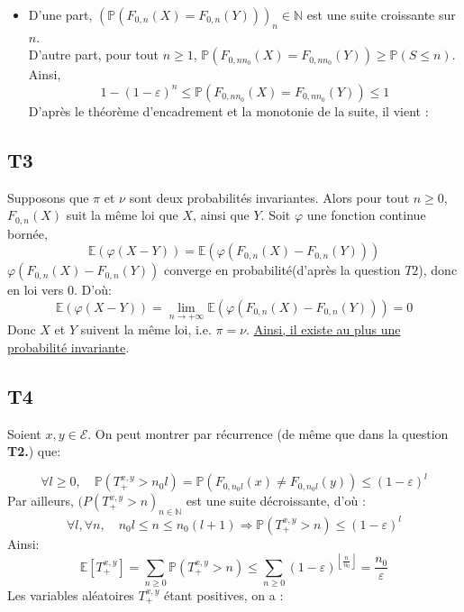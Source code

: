 \documentclass[a4paper,11pt]{article}
\def \P{\mathbb{P}}
\def \E{\mathcal{E}}
\def \esp{\mathbb{E}}
\begin{document}
\begin{itemize}
\begin{center}
\end{center}

\item[\textbullet]
D'une part, $(\mathbb{P}(F_{0,n}(X)=F_{0,n}(Y)))_n\in \mathbb{N}$ est une suite croissante sur $n$.\\
D'autre part, pour tout $n\geq 1$, $\mathbb{P}(F_{0,nn_0}(X)=F_{0,nn_0}(Y))\geq\mathbb{P}(S\leq n)$.\\
Ainsi,
\[1-(1-\varepsilon)^n\leq\mathbb{P}(F_{0,nn_0}(X)=F_{0,nn_0}(Y))\leq1\]
D'après le théorème d'encadrement et la monotonie de la suite, il vient :

\begin{center}
\end{center}

\end{itemize}

\subsection*{T3}
Supposons que $\pi$ et $\nu$ sont deux probabilités invariantes. 
Alors pour tout $n\geq0$, $F_{0,n}(X)$ suit la même loi que $X$, ainsi que $Y$.
Soit $\varphi$ une fonction continue bornée,
\[\mathbb{E}(\varphi(X-Y))=\mathbb{E}(\varphi(F_{0,n}(X)-F_{0,n}(Y)))\]
$\varphi(F_{0,n}(X)-F_{0,n}(Y))$ converge en probabilité(d'après la question $T2$), donc en loi vers $0$.
D'où:
\[\mathbb{E}(\varphi(X-Y))=\lim \limits_{n \rightarrow +\infty}\mathbb{E}(\varphi(F_{0,n}(X)-F_{0,n}(Y)))=0\]
Donc $X$ et $Y$ suivent la même loi, i.e. $\pi = \nu$.
\underline{Ainsi, il existe au plus une probabilité invariante}.

\subsection*{T4}
Soient $x,y \in \E$.
On peut montrer par récurrence (de même que dans la question \textbf{T2.}) que:

\[\forall l\geq 0, \quad \P(T_+^{x,y}>n_0l)=\P(F_{0,n_0l}(x)\ne F_{0,n_0l}(y))\leq (1-\varepsilon)^l\]
Par ailleurs, $(P(T_+^{x,y}>n)_{n \in \mathbb{N}}$ est une suite décroissante, d'où :
\[\forall l, \forall n, \quad n_0l\leq n \leq n_0(l+1) \Rightarrow \P(T_+^{x,y}>n) \leq (1-\varepsilon)^l \]
Ainsi: 
\[ \esp[T_+^{x,y}]  = \sum_{n\geq 0} \P(T_+^{x,y}>n) \le  \sum_{n\geq 0} (1-\varepsilon)^{\left\lfloor\frac{n}{n_0}\right\rfloor} = \frac{n_0}{\varepsilon} \] 
Les variables aléatoires $T_+^{x,y}$ étant positives, on a :
\end{document}
